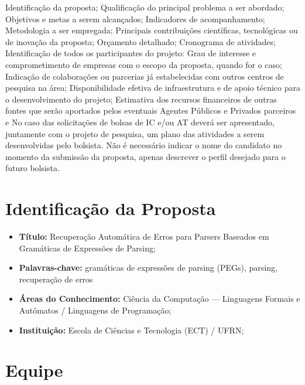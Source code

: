 \documentclass[titlepage,12pt]{article}
\begin{document}
Identificação da proposta;
Qualificação do principal problema a ser abordado;
Objetivos e metas a serem alcançados;
Indicadores de acompanhamento;
Metodologia a ser empregada;
Principais contribuições científicas, tecnológicas ou de inovação da proposta;
Orçamento detalhado;
Cronograma de atividades;
Identificação de todos os participantes do projeto:
Grau de interesse e comprometimento de empresas com o escopo da proposta,
quando for o caso;
Indicação de colaborações ou parcerias já estabelecidas com outros centros de
pesquisa na área;
Disponibilidade efetiva de infraestrutura e de apoio técnico para o desenvolvimento
do projeto;
Estimativa dos recursos financeiros de outras fontes que serão aportados pelos
eventuais Agentes Públicos e Privados parceiros e
No caso das solicitações de bolsas de IC e/ou AT deverá ser apresentado,
juntamente com o projeto de pesquisa, um plano das atividades a serem
desenvolvidas pelo bolsista. Não é necessário indicar o nome do candidato no
momento da submissão da proposta, apenas descrever o perfil desejado para o
futuro bolsista.



\section{Identificação da Proposta}
\label{sec:ident}


\begin{itemize}
	\item {\bf Título:} Recuperação Automática de Erros para Parsers Baseados
em Gramáticas de Expressões de Parsing;
  \item {\bf Palavras-chave:} gramáticas de expressões de parsing (PEGs),
   parsing, recuperação de erros
	\item {\bf Áreas do Conhecimento:} Ciência da Computação --- Linguagens Formais e Autômatos / Linguagens de Programação;
	\item {\bf Instituição:} Escola de Ciências e Tecnologia (ECT) / UFRN; 
\end{itemize}


\section{Equipe}
\end{document}
